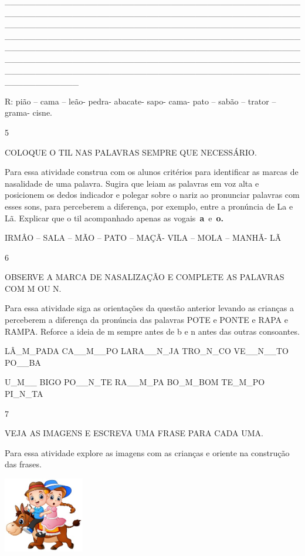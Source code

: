 {{\_\_\_\_\_\_\_\_\_\_\_\_\_\_\_\_\_\_\_\_\_\_\_\_\_\_\_\_\_\_\_\_\_\_\_\_\_\_\_\_\_\_\_\_\_\_\_\_\_\_\_\_\_\_\_\_\_\_\_\_\_\_\_\_\_\_\_\_\_\_\_\_\_\_\_\_\_\_\_\_\_\_\_\_\_\_\_\_\_\_\_\_\_\_\_\_\_\_\_\_\_\_\_\_\_\_\_\_\_\_\_\_\_\_\_\_\_\_\_\_\_\_\_\_\_\_\_\_\_\_\_\_\_\_\_\_\_\_\_\_\_\_\_\_\_\_\_\_\_\_\_\_\_\_\_\_\_\_\_\_\_\_\_\_\_\_\_\_\_\_\_\_\_\_\_\_\_\_\_\_\_\_\_\_\_\_\_\_\_\_\_\_\_\_\_\_\_\_\_\_\_\_\_\_\_\_\_\_\_\_\_\_\_\_\_\_\_\_\_\_\_\_\_\_\_\_\_\_\_\_\_\_\_\_\_\_\_\_\_\_\_\_\_\_\_\_\_\_\_\_\_\_\_\_\_\_\_\_\_\_\_\_\_\_\_\_\_\_\_\_\_\_\_\_\_\_\_\_\_\_\_\_\_\_\_\_\_\_\_\_\_\_\_\_\_\_\_\_\_\_\_\_\_\_\_\_\_\_\_\_\_\_\_\_\_\_\_\_\_\_\_\_\_\_\_\_\_\_\_\_\_\_\_\_\_\_\_\_\_\_\_\_\_\_\_\_\_\_

R: pião -- cama -- leão- pedra- abacate- sapo- cama- pato -- sabão --
trator -- grama- cisne.

\num{5}

COLOQUE O TIL NAS PALAVRAS SEMPRE QUE NECESSÁRIO.

Para essa atividade construa com os alunos critérios para identificar as
marcas de nasalidade de uma palavra. Sugira que leiam as palavras em voz
alta e posicionem os dedos indicador e polegar sobre o nariz ao
pronunciar palavras com esses sons, para perceberem a diferença, por
exemplo, entre a pronúncia de La e Lã. Explicar que o til acompanhado
apenas as vogais~\textbf{a}~e~\textbf{o.}

IRMÂO -- SALA -- MÃO -- PATO -- MAÇÃ- VILA -- MOLA -- MANHÃ- LÃ

\num{6}

OBSERVE A MARCA DE NASALIZAÇÃO E COMPLETE AS PALAVRAS COM M OU N.

Para essa atividade siga as orientações da questão anterior levando as
crianças a perceberem a diferença da pronúncia das palavras POTE e PONTE
e RAPA e RAMPA. Reforce a ideia de m sempre antes de b e n antes das
outras consoantes.

LÂ\_M\_PADA CA\_\_M\_\_PO LARA\_\_N\_JA TRO\_N\_CO VE\_\_N\_\_TO
PO\_\_BA

U\_M\_\_ BIGO PO\_\_N\_TE RA\_\_M\_PA BO\_M\_BOM TE\_M\_PO PI\_N\_TA

\num{7}

VEJA AS IMAGENS E ESCREVA UMA FRASE PARA CADA UMA.

Para essa atividade explore as imagens com as crianças e oriente na
construção das frases.

\includegraphics[width=1.38264in,height=1.28681in]{media/image67.jpeg}

}}
